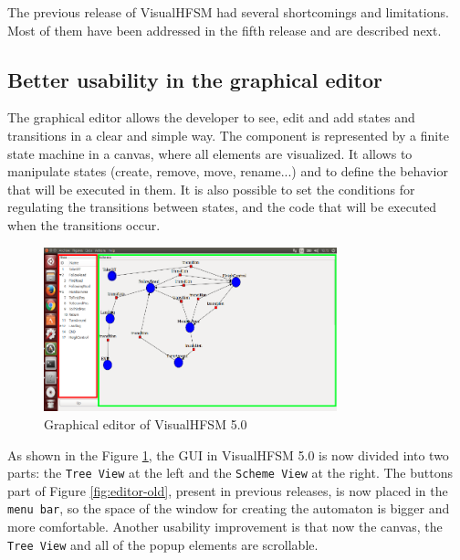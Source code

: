 \documentclass[journal,twoside]{JoPhA}
\begin{document}

The previous release of VisualHFSM had several shortcomings and limitations. Most of them have been addressed in the fifth release and are described next.

\subsection{Better usability in the graphical editor}

The graphical editor allows the developer to see, edit and add states and transitions in a clear and simple way. The component is represented by a finite state machine in a canvas, where all elements are visualized. It allows to manipulate states (create, remove, move, rename...) and to define the behavior that will be executed in them. It is also possible to set the conditions for regulating the transitions between states, and the code that will be executed when the transitions occur.

\begin{figure}[ht!]
\begin{center}
        \includegraphics[width=8.5cm]{figs/editorColor.png}
\end{center}
\caption{Graphical editor of VisualHFSM 5.0}
\label{fig:editor}
\end{figure}

As shown in the Figure \ref{fig:editor}, the GUI in VisualHFSM 5.0 is now divided into two parts: the \texttt{Tree View} at the left and the \texttt{Scheme View} at the right. The buttons part of Figure \ref{fig:editor-old}, present in previous releases, is now placed in the \texttt{menu bar}, so the space of the window for creating the automaton is bigger and more comfortable. Another usability improvement is that now the canvas, the \texttt{Tree View} and all of the popup elements are scrollable.
\end{document}
